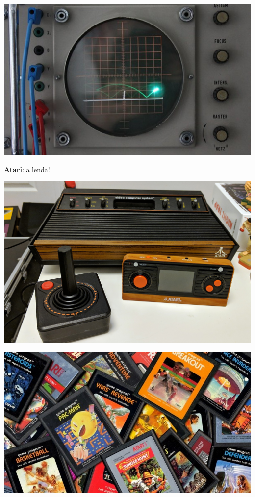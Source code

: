 \begin{multicols}{2}
\vfill\null
\columnbreak

\begin{center}
	\includegraphics[width=\linewidth]{./IMG/tenis-3.jpg}
\end{center}

\vfill\null
\columnbreak


\Large \textbf{Atari}: a lenda!

	\begin{center}
	\includegraphics[width=\linewidth]{./IMG/atari-2600-handheld-pic3-2222881701.jpg}
\end{center}

\vfil\null
\columnbreak

	\begin{center}
	\includegraphics[width=\linewidth]{./IMG/ATARI-1124950375.jpg}
\end{center}


\end{multicols}
